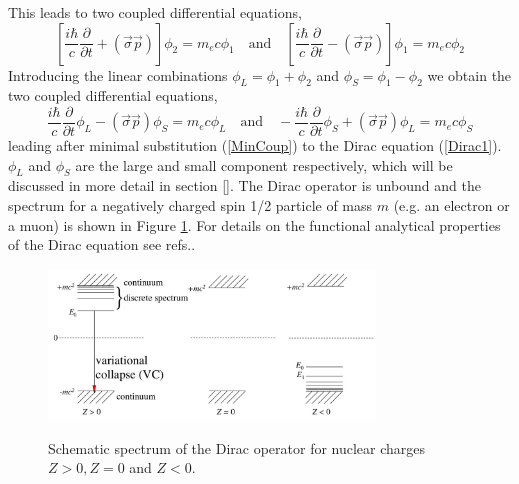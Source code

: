 \documentclass[12pt]{article}
\begin{document}
This leads to two coupled differential equations,
\begin{equation}
   \left[ \frac{i\hbar}{c} \frac{\partial}{\partial t} + \left(\vec{\sigma}\vec{p}\right) \right] \phi_2 = m_ec\phi_1
   \quad \text{and} \quad \left[ \frac{i\hbar}{c} \frac{\partial}{\partial t} - \left(\vec{\sigma}\vec{p}\right) \right]\phi_1 = m_ec\phi_2
   \label{QuantEnerMom2}
\end{equation}
Introducing the linear combinations $\phi_L=\phi_1+\phi_2$ and $\phi_S=\phi_1-\phi_2$ we obtain the two coupled differential equations,
\begin{equation}
   \frac{i\hbar}{c} \frac{\partial}{\partial t}\phi_L - \left(\vec{\sigma}\vec{p}\right) \phi_S = m_ec\phi_L
   \quad \text{and} \quad -\frac{i\hbar}{c} \frac{\partial}{\partial t}\phi_S + \left(\vec{\sigma}\vec{p}\right) \phi_L = m_ec\phi_S
   \label{DiracEq2}
\end{equation}   
leading after minimal substitution (\ref{MinCoup}) to the Dirac equation (\ref{Dirac1}). $\phi_L$ and $\phi_S$ are the large and small component respectively, which will be discussed in more detail in section \ref{}. The Dirac operator is unbound and the spectrum for a negatively charged spin 1/2 particle of mass $m$ (e.g. an electron or a muon) is shown in Figure \ref{fig:spec}. For details on the functional analytical properties of the Dirac equation see refs.\cite{Batz-1973,thaller-1992}.

\begin{figure}[htp!]
\centering
\includegraphics[height=40mm]{figspec.jpg}\\
\caption{Schematic spectrum of the Dirac operator for nuclear charges $Z>0, Z=0$ and $Z<0$.}
\label{fig:spec}
\end{figure}
\end{document}
